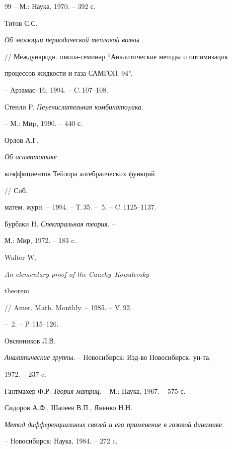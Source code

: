 \begin{thebibliography}{99}
-- М.: Наука, 1970. -- 392 с.


 Титов С.С.


{\em Об эволюции периодической тепловой волны}


// Международн. школа-семинар ``Аналитические методы и оптимизация


процессов жидкости и газа САМГОП--94''.


-- Арзамас--16, 1994. -- C.\,107--108.




Стенли P. {\em Пеpечислительная комбинатоpика}.


-- М.: Миp, 1990. -- 440 с.


 Орлов А.Г. {\em Об асимптотике


коэффициентов Тейлора алгебраических функций} // Сиб.


матем. журн. -- 1994. -- Т.\,35. -- \No\,5. -- C.\,1125--1137.


 Бурбаки H. {\em Спектральная теория}. --


М.: Мир, 1972. -- 183 c.


 Walter W.


{\em An elementary proof of the Cauchy--Kowalevsky


theorem} // Amer. Math. Monthly. -- 1985. -- V.\,92.


-- \No\,2. -- P.\,115--126.


 Овсянников Л.В.


{\em Аналитические группы}. -- Новосибирск: Изд-во Новосибирск. ун-та,


1972. -- 237 c.




Гантмахер Ф.Р. {\em Теория матриц}. -- М.: Наука, 1967. -- 575 с.


 Сидоров А.Ф., Шапеев В.П., Яненко Н.Н.


{\em Метод дифференциальных связей и его применение в газовой динамике}.


-- Новосибирск: Наука, 1984. -- 272 c.





\end{thebibliography}





\vskip 2cm














\label{end}





